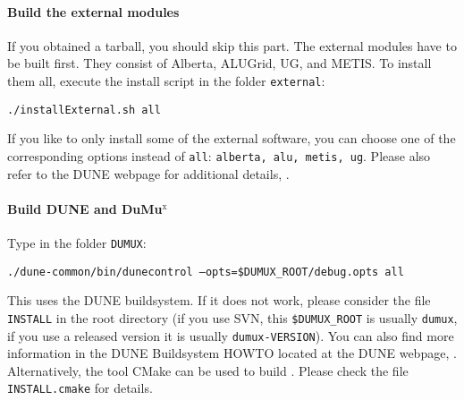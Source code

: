\paragraph{Build the external modules} 
If you obtained a \Dumux tarball, you should skip this part. 
The external modules have to be built first. They consist of Alberta, ALUGrid, UG, and METIS.
To install them all, execute the install script in the folder \texttt{external}:
\begin{center}
\texttt{./installExternal.sh all}
\end{center}
If you like to only install some of the external software, you can choose one of the 
corresponding options instead of \texttt{all}: \texttt{alberta, alu, metis, ug}.
Please also refer to the DUNE webpage for additional details, \cite{DUNE-HP}. 

\paragraph{Build DUNE and DuMu$^\text{x}$}
Type in the folder \texttt{DUMUX}: 
\begin{center}
\texttt{./dune-common/bin/dunecontrol --opts=\$DUMUX\_ROOT/debug.opts all}
\end{center}
This uses the DUNE buildsystem. If it does not work, please consider
the file \texttt{INSTALL} in the \Dumux root directory (if you use
SVN, this \texttt{\$DUMUX\_ROOT} is usually \texttt{dumux}, if you use
a released version it is usually \texttt{dumux-VERSION}). You can also
find more information in the DUNE Buildsystem HOWTO located at the
DUNE webpage, \cite{DUNE-HP}.  Alternatively, the tool CMake can be
used to build \Dumux. Please check the file \texttt{INSTALL.cmake} for
details.
